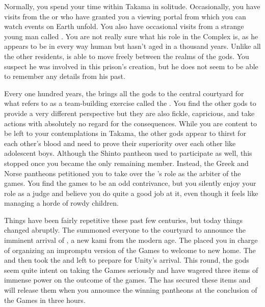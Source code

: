 \documentclass[char]{guardians}
\begin{document}
Normally, you spend your time within Takama in solitude. Occasionally, you have visits from the \cCaretaker{} or \cWarden{} who have granted you a viewing portal from which you can watch events on Earth unfold. You also have occasional visits from a strange young man called \cJascha{\intro}. You are not really sure what his role in the Complex is, as he appears to be in every way human but hasn't aged in a thousand years. Unlike all the other residents, \cJascha{} is able to move freely between the realms of the gods. You suspect he was involved in this prison's creation, but he does not seem to be able to remember any details from his past.

Every one hundred years, the \cCaretaker{} brings all the gods to the central courtyard for what \cCaretaker{\they} refers to as a team-building exercise called the \pGames{}. You find the other gods to provide a very different perspective but they are also fickle, capricious, and take actions with absolutely no regard for the consequences. While you are content to be left to your contemplations in Takama, the other gods appear to thirst for each other's blood and need to prove their superiority over each other like adolescent boys. Although the Shinto pantheon used to participate as well, this stopped once you became the only remaining member. Instead, the Greek and Norse pantheons petitioned you to take over the \cCaretaker{}'s role as the arbiter of the games. You find the games to be an odd contrivance, but you silently enjoy your role as a judge and believe you do quite a good job at it, even though it feels like managing a horde of rowdy children.

Things have been fairly repetitive these past few centuries, but today things changed abruptly. The \cCaretaker{} summoned everyone to the courtyard to announce the imminent arrival of \cUnity{}, a new kami from the modern age. The \cCaretaker{} placed you in charge of organizing an impromptu version of the Games to welcome \cUnity{} to \cUnity{\their} new home. The \cCaretaker{} and \cWarden{} then took the \stone{} and left to prepare for Unity's arrival. This round, the gods seem quite intent on taking the Games seriously and have wagered three items of immense power on the outcome of the games. The \cCaretaker{} has secured these items and will release them when you announce the winning pantheons at the conclusion of the Games in three hours.

\end{document}
